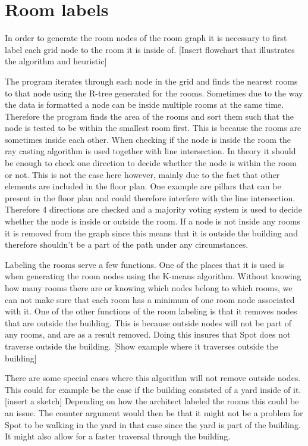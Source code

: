 \section{Room labels}\label{room_labels}
In order to generate the room nodes of the room graph it is necessary to first label each grid node to the room it is inside of. [Insert flowchart that illustrates the algorithm and heuristic]

The program iterates through each node in the grid and finds the nearest rooms to that node using the R-tree generated for the rooms. Sometimes due to the way the data is formatted a node can be inside multiple rooms at the same time. Therefore the program finds the area of the rooms and sort them such that the node is tested to be within the smallest room first. This is because the rooms are sometimes inside each other.
When checking if the node is inside the room the ray casting algorithm is used together with line intersection. In theory it should be enough to check one direction to decide whether the node is within the room or not. This is not the case here however, mainly due to the fact that other elements are included in the floor plan. One example are pillars that can be present in the floor plan and could therefore interfere with the line intersection. 
Therefore 4 directions are checked and a majority voting system is used to decide whether the node is inside or outside the room.
If a node is not inside any rooms it is removed from the graph since this means that it is outside the building and therefore shouldn't be a part of the path under any circumstances.

Labeling the rooms serve a few functions. One of the places that it is used is when generating the room nodes using the K-means algorithm. Without knowing how many rooms there are or knowing which nodes belong to which rooms, we can not make sure that each room has a minimum of one room node associated with it.
One of the other functions of the room labeling is that it removes nodes that are outside the building. This is because outside nodes will not be part of any rooms, and are as a result removed. Doing this insures that Spot does not traverse outside the building. [Show example where it traverses outside the building]


There are some special cases where this algorithm will not remove outside nodes. This could for example be the case if the building consisted of a yard inside of it. [insert a sketch] Depending on how the architect labeled the rooms this could be an issue. The counter argument would then be that it might not be a problem for Spot to be walking in the yard in that case since the yard is part of the building. It might also allow for a faster traversal through the building. 

